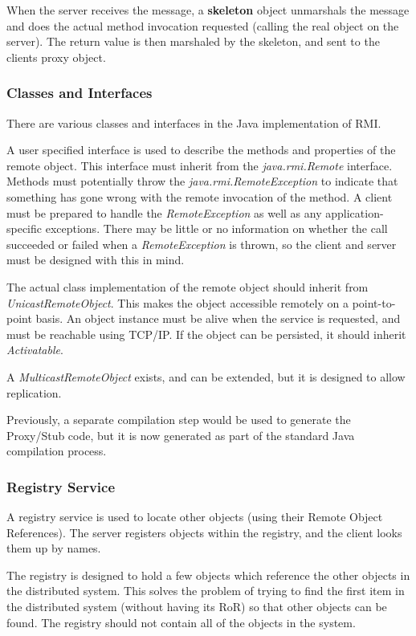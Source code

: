 \documentclass{article}
\begin{document}
When the server receives the message, a \textbf{skeleton} object unmarshals the message and does the actual method invocation requested (calling the real object on the server). The return value is then marshaled by the skeleton, and sent to the clients proxy object.

\subsubsection{Classes and Interfaces}
There are various classes and interfaces in the Java implementation of RMI. 

A user specified interface is used to describe the methods and properties of the remote object. This interface must inherit from the \textit{java.rmi.Remote} interface. Methods must potentially throw the \textit{java.rmi.RemoteException} to indicate that something has gone wrong with the remote invocation of the method. A client must be prepared to handle the \textit{RemoteException} as well as any application-specific exceptions. There may be little or no information on whether the call succeeded or failed when a \textit{RemoteException} is thrown, so the client and server must be designed with this in mind. 

The actual class implementation of the remote object should inherit from \textit{UnicastRemoteObject}. This makes the object accessible remotely on a point-to-point basis. An object instance must be alive when the service is requested, and must be reachable using TCP/IP. If the object can be persisted, it should inherit \textit{Activatable}. 

A \textit{MulticastRemoteObject} exists, and can be extended, but it is designed to allow replication. 

Previously, a separate compilation step would be used to generate the Proxy/Stub code, but it is now generated as part of the standard Java compilation process. 

\subsubsection{Registry Service}
A registry service is used to locate other objects (using their Remote Object References). The server registers objects within the registry, and the client looks them up by names. 

The registry is designed to hold a few objects which reference the other objects in the distributed system. This solves the problem of trying to find the first item in the distributed system (without having its RoR) so that other objects can be found. The registry should not contain all of the objects in the system. 
\end{document}
